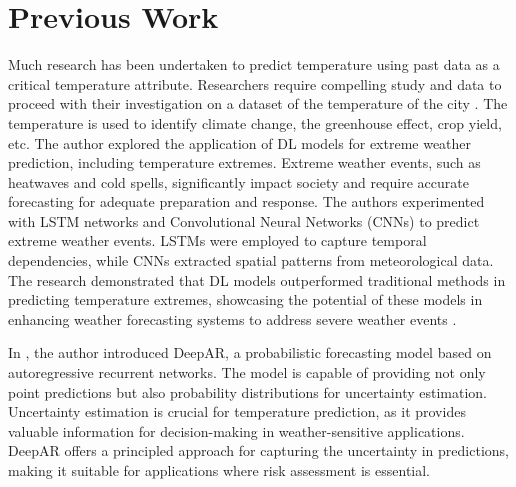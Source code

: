 
\chapter{Previous Work} %

\label{c2} %


Much research has been undertaken to predict temperature using past data as a critical temperature attribute. Researchers require compelling study and data to proceed with their investigation on a dataset of the temperature of the city \cite{cifuentes2020air}. The temperature is used to identify climate change, the greenhouse effect, crop yield, etc.
\cite{2019AGUFMGC33A..05P}The author explored the application of DL models for extreme weather prediction, including temperature extremes. Extreme weather events, such as heatwaves and cold spells, significantly impact society and require accurate forecasting for adequate preparation and response. The authors experimented with LSTM networks and Convolutional Neural Networks (CNNs) to predict extreme weather events. LSTMs were employed to capture temporal dependencies, while CNNs extracted spatial patterns from meteorological data. The research demonstrated that DL models outperformed traditional methods in predicting temperature extremes, showcasing the potential of these models in enhancing weather forecasting systems to address severe weather events \cite{miao2020application} \cite{hou2022prediction}.

In \cite{salinas2020deepar}, the author introduced DeepAR, a probabilistic forecasting model based on autoregressive recurrent networks. The model is capable of providing not only point predictions but also probability distributions for uncertainty estimation. Uncertainty estimation is crucial for temperature prediction, as it provides valuable information for decision-making in weather-sensitive applications. DeepAR offers a principled approach for capturing the uncertainty in predictions, making it suitable for applications where risk assessment is essential.

